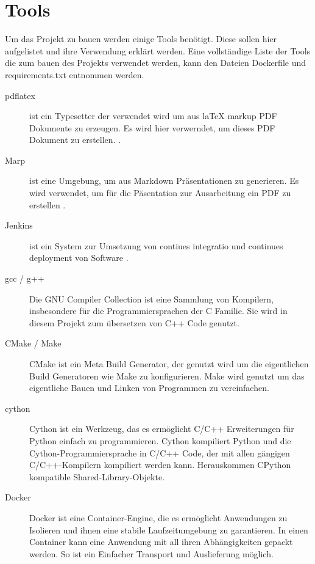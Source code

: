 \chapter{Tools}
\label{chap:tools}

Um das Projekt zu bauen werden einige Tools benötigt. Diese sollen hier aufgelistet und ihre Verwendung erklärt werden.
Eine vollständige Liste der Tools die zum bauen des Projekts verwendet werden, kann den Dateien \glqq Dockerfile \grqq{} und \glqq requirements.txt \grqq{} entnommen werden.

\begin{description}
    \item[pdflatex] ist ein Typesetter der verwendet wird um aus laTeX markup PDF Dokumente zu erzeugen. Es wird hier verwerndet, um dieses PDF Dokument zu erstellen. \cite{MANLATEX}.
    \item[Marp] ist eine Umgebung, um aus Markdown Präsentationen zu generieren. Es wird verwendet, um für die Päsentation zur Ausarbeitung ein PDF zu erstellen \cite{MARP2024}.
    \item[Jenkins] ist ein System zur Umsetzung von \glqq contiues integratio \grqq{} und \glqq continues deployment\grqq{} von Software \cite{JENKINS2024}.
    \item[gcc / g++] Die GNU Compiler Collection ist eine Sammlung von Kompilern, insbesondere für die Programmiersprachen der C Familie\cite{GCC2024}. Sie wird in diesem Projekt zum übersetzen von C++ Code genutzt.
    \item[CMake / Make] CMake ist ein Meta Build Generator, der genutzt wird um die eigentlichen Build Generatoren wie Make zu konfigurieren. Make wird genutzt um das eigentliche Bauen und Linken von Programmen zu vereinfachen\cite{CMAKE2024}.
    \item[cython] Cython ist ein Werkzeug, das es ermöglicht C/C++ Erweiterungen für Python einfach zu programmieren. Cython kompiliert Python und die Cython-Programmiersprache in C/C++ Code, der mit allen gängigen C/C++-Kompilern kompiliert werden kann. Herauskommen CPython kompatible Shared-Library-Objekte\cite{behnel2011}.
    \item[Docker] Docker ist eine Container-Engine, die es ermöglicht Anwendungen zu Isolieren und ihnen eine stabile Laufzeitumgebung zu garantieren. In einen Container kann eine Anwendung mit all ihren Abhängigkeiten gepackt werden. So ist ein Einfacher Transport und Auslieferung möglich\cite{merkel2014}.
\end{description}
